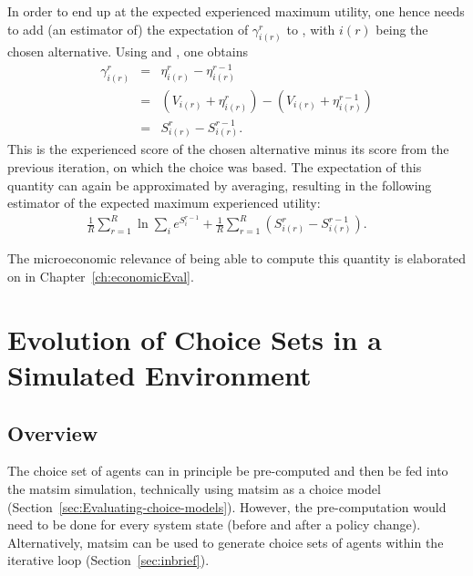 In order to end up at the expected experienced maximum utility, one
hence needs to add (an estimator of) the expectation of $\gamma_{i(r)}^{r}$
to , with $i(r)$ being the chosen alternative. 
Using  and ,
one obtains
\begin{eqnarray}
\gamma_{i(r)}^{r} & = & \eta_{i(r)}^{r}-\eta_{i(r)}^{r-1}\\
 & = & (V_{i(r)}+\eta_{i(r)}^{r})-(V_{i(r)}+\eta_{i(r)}^{r-1})\\
 & = & S_{i(r)}^{r}-S_{i(r)}^{r-1}.
\end{eqnarray}
This is the experienced score of the chosen alternative minus its
score from the previous iteration, on which the choice was based.
The expectation of this quantity can again be approximated by averaging,
resulting in the following estimator of the expected maximum experienced
utility:
\begin{eqnarray}
\frac{1}{R}\sum_{r=1}^{R}\ln\sum_{i}e^{S_i^{r-1}}
+
\frac{1}{R}\sum_{r=1}^{R}\left(S_{i(r)}^{r}-S_{i(r)}^{r-1}\right).\label{eq:wartezimmer-corrected}
& &
\end{eqnarray}

The microeconomic relevance of being able to compute this quantity is 
elaborated on in Chapter~\ref{ch:economicEval}.

\section{Evolution of Choice Sets in a Simulated
Environment}
\label{sec:Evolution-of-choice}

\subsection{Overview}

The choice set of agents can in principle be pre-computed and then be fed into the \acrshort{matsim} simulation, technically using \gls{matsim} as a choice model (Section~\ref{sec:Evaluating-choice-models}).
%
However, the pre-computation would need to be done for every system state (\eg before and after a policy change). Alternatively, \acrshort{matsim} can be used to generate choice sets of agents within the iterative loop (Section~\ref{sec:inbrief}).
%
%

